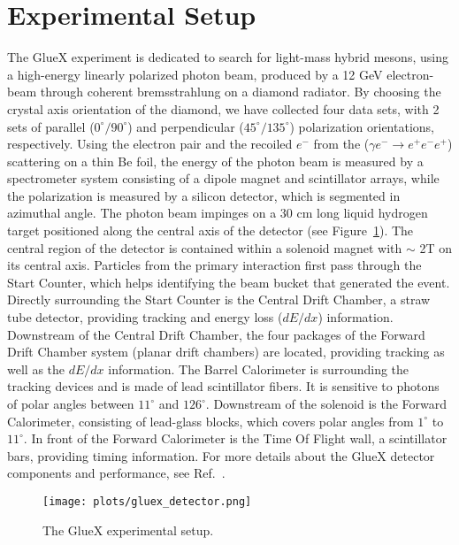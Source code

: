 \documentclass[a4paper]{jpconf}
\begin{document}
\section{Experimental Setup}
The GlueX experiment is dedicated to search for light-mass hybrid mesons, using a high-energy linearly polarized photon beam, produced by a 12 GeV electron-beam through coherent bremsstrahlung on a diamond radiator. By choosing the crystal axis orientation of the diamond, we have collected four data sets, with 2 sets of parallel ($0^{\circ}/90^{\circ}$) and perpendicular ($45^{\circ}/135^{\circ}$) polarization orientations, respectively. Using the electron pair and the recoiled $e^{-}$ from the ($\gamma e^{-} \rightarrow e^{+}e^{-}e^{+}$) scattering on a thin Be foil, the energy of the photon beam is measured by a spectrometer system consisting of a dipole magnet and scintillator arrays, while the polarization is measured by a silicon detector, which is segmented in azimuthal angle. The photon beam impinges on a 30 cm long liquid hydrogen target positioned along the central axis of the detector (see Figure~\ref{fig.1}). The central region of the detector is contained within a solenoid magnet with $\sim$ 2T on its central axis. Particles from the primary interaction first pass through the Start Counter, which helps identifying the beam bucket that generated the event. Directly surrounding the Start Counter is the Central Drift Chamber, a straw tube detector, providing tracking and energy loss ($dE/dx$) information. Downstream of the Central Drift Chamber, the four packages of the Forward Drift Chamber system (planar drift chambers) are located, providing tracking as well as the $dE/dx$ information. The Barrel Calorimeter is surrounding the tracking devices and is made of lead scintillator fibers. It is sensitive to photons of polar angles between $11^{\circ}$ and $126^{\circ}$. Downstream of the solenoid is the Forward Calorimeter, consisting of lead-glass blocks, which covers polar angles from $1^{\circ}$ to $11^{\circ}$. In front of the Forward Calorimeter is the Time Of Flight wall, a scintillator bars, providing timing information. For more details about the GlueX detector components and performance, see Ref.~\cite{ref.3}.

\begin{figure}[h]
    \centering
    \texttt{[image: plots/gluex\_detector.png]}
    \caption{\label{fig.1}The GlueX experimental setup.}
\end{figure}
\end{document}
